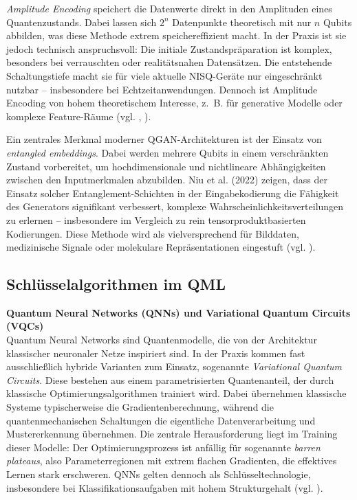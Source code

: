 \textit{Amplitude Encoding} speichert die Datenwerte direkt in den Amplituden eines Quantenzustands. Dabei lassen sich $2^n$ Datenpunkte theoretisch mit nur $n$ Qubits abbilden, was diese Methode extrem speichereffizient macht. In der Praxis ist sie jedoch technisch anspruchsvoll: Die initiale Zustandspräparation ist komplex, besonders bei verrauschten oder realitätsnahen Datensätzen. Die entstehende Schaltungstiefe macht sie für viele aktuelle NISQ-Geräte nur eingeschränkt nutzbar – insbesondere bei Echtzeitanwendungen. Dennoch ist Amplitude Encoding von hohem theoretischem Interesse, z.~B. für generative Modelle oder komplexe Feature-Räume (vgl. \cite{schuld_introduction_2015}, \cite{zoufal_quantum_2019}).



Ein zentrales Merkmal moderner QGAN-Architekturen ist der Einsatz von \textit{entangled embeddings}. Dabei werden mehrere Qubits in einem verschränkten Zustand vorbereitet, um hochdimensionale und nichtlineare Abhängigkeiten zwischen den Inputmerkmalen abzubilden. Niu et al. (2022) zeigen, dass der Einsatz solcher Entanglement-Schichten in der Eingabekodierung die Fähigkeit des Generators signifikant verbessert, komplexe Wahrscheinlichkeitsverteilungen zu erlernen – insbesondere im Vergleich zu rein tensorproduktbasierten Kodierungen. Diese Methode wird als vielversprechend für Bilddaten, medizinische Signale oder molekulare Repräsentationen eingestuft (vgl. \cite{niu_entangling_2022}).


\subsection{Schlüsselalgorithmen im QML}  
\textbf{Quantum Neural Networks (QNNs) und Variational Quantum Circuits (VQCs)}\\
Quantum Neural Networks sind Quantenmodelle, die von der Architektur klassischer neuronaler Netze inspiriert sind. In der Praxis kommen fast ausschließlich hybride Varianten zum Einsatz, sogenannte \textit{Variational Quantum Circuits}. Diese bestehen aus einem parametrisierten Quantenanteil, der durch klassische Optimierungsalgorithmen trainiert wird. Dabei übernehmen klassische Systeme typischerweise die Gradientenberechnung, während die quantenmechanischen Schaltungen die eigentliche Datenverarbeitung und Mustererkennung übernehmen. Die zentrale Herausforderung liegt im Training dieser Modelle: Der Optimierungsprozess ist anfällig für sogenannte \textit{barren plateaus}, also Parameterregionen mit extrem flachen Gradienten, die effektives Lernen stark erschweren. QNNs gelten dennoch als Schlüsseltechnologie, insbesondere bei Klassifikationsaufgaben mit hohem Strukturgehalt (vgl. \cite{liuQuantumTrainRethinkingHybrid2024}).


